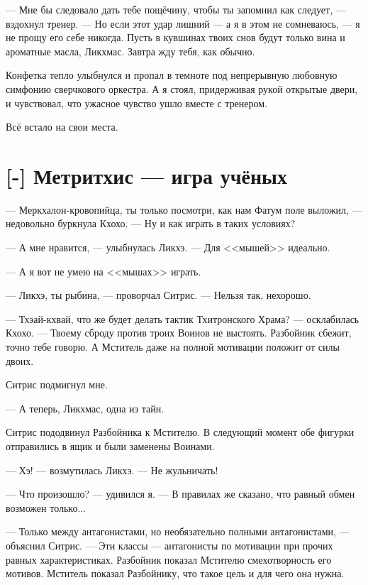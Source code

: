 --- Мне бы следовало дать тебе пощёчину, чтобы ты запомнил как следует, --- вздохнул тренер.
--- Но если этот удар лишний --- а я в этом не сомневаюсь, --- я не прощу его себе никогда.
Пусть в кувшинах твоих снов будут только вина и ароматные масла, Ликхмас.
Завтра жду тебя, как обычно.

Конфетка тепло улыбнулся и пропал в темноте под непрерывную любовную симфонию сверчкового оркестра.
А я стоял, придерживая рукой открытые двери, и чувствовал, что ужасное чувство ушло вместе с тренером.

Всё встало на свои места.

\section{[-] Метритхис --- игра учёных}


--- Меркхалон-кровопийца, ты только посмотри, как нам Фатум поле выложил, --- недовольно буркнула Кхохо.
--- Ну и как играть в таких условиях?

--- А мне нравится, --- улыбнулась Ликхэ.
--- Для <<мышей>> идеально.

--- А я вот не умею на <<мышах>> играть.

\textspace

--- Ликхэ, ты рыбина, --- проворчал Ситрис.
--- Нельзя так, нехорошо.

--- Тхэай-кхвай, что же будет делать тактик Тхитронского Храма? --- осклабилась Кхохо.
--- Твоему сброду против троих Воинов не выстоять.
Разбойник сбежит, точно тебе говорю.
А Мститель даже на полной мотивации положит от силы двоих.

Ситрис подмигнул мне.

--- А теперь, Ликхмас, одна из тайн.

Ситрис пододвинул Разбойника к Мстителю.
В следующий момент обе фигурки отправились в ящик и были заменены Воинами.

--- Хэ! --- возмутилась Ликхэ.
--- Не жульничать!

--- Что произошло? --- удивился я.
--- В правилах же сказано, что равный обмен возможен только...

--- Только между антагонистами, но необязательно полными антагонистами, --- объяснил Ситрис.
--- Эти классы --- антагонисты по мотивации при прочих равных характеристиках.
Разбойник показал Мстителю смехотворность его мотивов.
Мститель показал Разбойнику, что такое цель и для чего она нужна.

